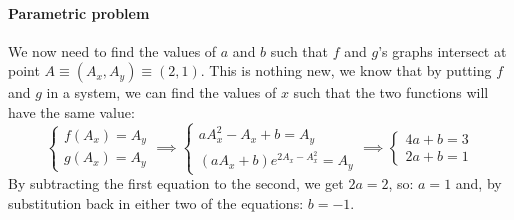 \paragraph[Problem 2]{Parametric problem}
\label{par:subp2_1}
We now need to find the values of $a$ and $b$ such that
$f$ and $g$'s graphs intersect at point $A \equiv (A_x, A_y) \equiv (2,1)$.
This is nothing new, we know that by putting $f$ and $g$ in a system, we can
find the values of $x$ such that the two functions will have the same value:
\begin{equation*}
    \begin{cases}
        f(A_x) = A_y\\
        g(A_x) = A_y
    \end{cases}
    \implies
    \begin{cases}
        aA_x^2 - A_x + b = A_y\\
        (aA_x + b)e^{2A_x - A_x^2} = A_y
    \end{cases}
    \implies
    \begin{cases}
        4a + b = 3\\
        2a + b = 1
    \end{cases}
\end{equation*}
By subtracting the first equation to the second, we get $2a = 2$, so:
$a = 1$ and, by substitution back in either two of the equations: $b = -1$.

